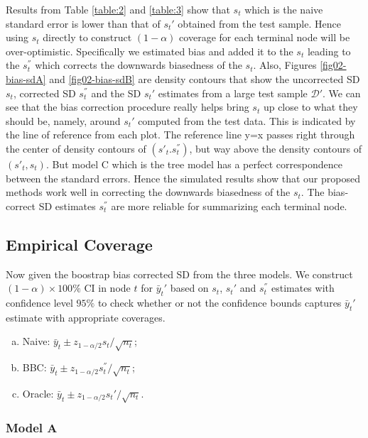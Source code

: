 Results from Table \ref{table:2} and \ref{table:3} show that $s_t$ which is the naive standard error is lower than  that of $s_t'$ obtained from the test sample. Hence using $s_t$ directly to construct  $(1-\alpha)$ coverage for each terminal node will be over-optimistic. Specifically we estimated bias and added it to the $s_t$ leading to the $s^{''}_t$ which corrects the downwards biasedness of the $s_t$.
Also, Figures \ref{fig02-bias-sdA} and \ref{fig02-bias-sdB} are density contours that show the uncorrected SD $s_t$, corrected SD $s^{''}_t$ and the SD $s_t'$ estimates from a large test sample $\mathcal{D}'$. We can see that the bias correction procedure really helps bring $s_t$ up close to what they should be, namely, around $s_t'$ computed from the test data. This is indicated by the line of reference from each plot. The reference line y=x passes right through the center of density contours of $(s'_t.  s_t^{''})$, but way above the density contours of $(s'_t, s_t).$ 
But model C which is the tree model has a perfect correspondence between the standard errors. Hence the simulated results show that our proposed methods work well in correcting the downwards biasedness of the $s_t$. The bias-correct SD estimates $s_t^{''}$ are more reliable for summarizing each terminal node.

\subsection{Empirical Coverage}
Now given the boostrap bias corrected SD from the three models. We construct $(1-\alpha) \times 100\%$ CI in node $t$ for $\bar{y}_t'$ based on $s_t$, $s_t'$ and $s^{''}_t$ estimates with confidence level $95\%$ to check whether or not the confidence bounds captures $\bar{y}_t'$ estimate with appropriate coverages.

\begin{enumerate}[(a)]
	\item Naive:  $\bar{y}_t \pm z_{1-\alpha/2} s_t /\sqrt{n_t}$;
	
	\item BBC: $\bar{y}_t \pm z_{1-\alpha/2} s^{''}_t /\sqrt{n_t}$;
	
	\item Oracle: $\bar{y}_t \pm z_{1-\alpha/2} s_t' /\sqrt{n_t}$.
\end{enumerate}

\subsubsection{Model A}

